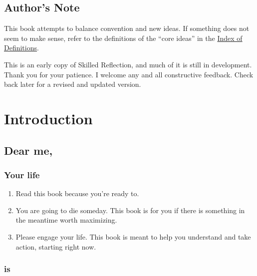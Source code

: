 \documentclass[
]{book}
\providecommand{\tightlist}{%
  \setlength{\itemsep}{0pt}\setlength{\parskip}{0pt}}
\begin{document}
\hypertarget{authors-note}{%
\section{Author's Note}\label{authors-note}}

This book attempts to balance convention and new ideas. If something does not seem to make sense, refer to the definitions of the ``core ideas'' in the \protect\hyperlink{index-of-definitions}{Index of Definitions}.

This is an early copy of Skilled Reflection, and much of it is still in development. Thank you for your patience. I welcome any and all constructive feedback. Check back later for a revised and updated version.

\hypertarget{introduction}{%
\chapter{Introduction}\label{introduction}}

\hypertarget{dear-me}{%
\section{Dear me,}\label{dear-me}}

\hypertarget{your-life}{%
\subsection{Your life}\label{your-life}}

\begin{enumerate}
\def\labelenumi{\arabic{enumi}.}
\tightlist
\item
  Read this book because you're ready to.
\item
  You are going to die someday. This book is for you if there is something in the
  meantime worth maximizing.
\item
  Please engage your life.
  This book is meant to help you understand and take action, starting right now.
\end{enumerate}

\hypertarget{is}{%
\subsection{is}\label{is}}
\end{document}
